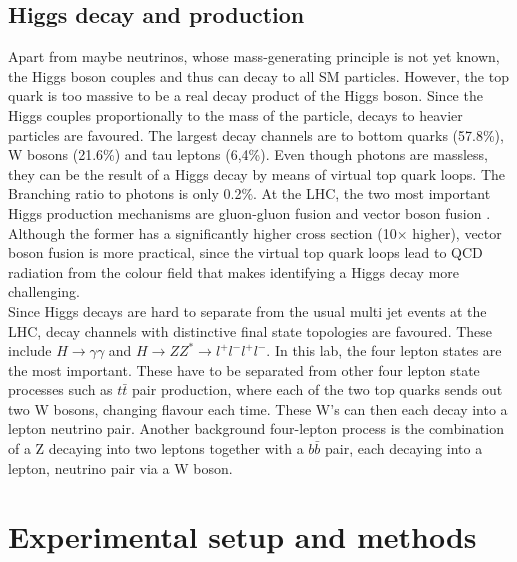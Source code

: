 \documentclass[twoside,        %
               BCOR12mm,       %
               ngerman,english, %
               fleqn,headsepline=false,footsepline=false
              ]{Vorlage/MFPREPORT}
\begin{document}
\subsection{Higgs decay and production}
\label{sec:bg}
Apart from maybe neutrinos, whose mass-generating principle is not yet known,
the Higgs boson couples and thus can decay to all SM particles. However, the
top quark is too massive to be a real decay product of the Higgs boson. Since
the Higgs couples proportionally to the mass of the particle, decays to heavier
particles are favoured. The largest decay channels are to bottom quarks
(57.8\%), W bosons (21.6\%) and tau leptons (6,4\%). Even though photons are
massless, they can be the result of a Higgs decay by means of virtual top quark
loops. The Branching ratio to photons is only 0.2\%.
At the LHC, the two most important Higgs production mechanisms are gluon-gluon
fusion and vector boson fusion \cite[p.\;490f]{thomson}. Although the former
has a significantly higher cross section (10$\times$ higher), vector boson fusion is more
practical, since the virtual top quark loops lead to QCD radiation from the
colour field that makes identifying a Higgs decay more challenging.\\
Since Higgs decays are hard to separate from the usual multi jet events at the
LHC, decay channels with distinctive final state topologies are favoured. These
include $H\rightarrow\gamma\gamma$ and $H\rightarrow ZZ^*\rightarrow
l^+l^-l^+l^-$. In this lab, the four lepton states are the most important. 
These have to be separated from other four lepton state processes such as
$t\bar t$ pair production, where each of the two top quarks sends out two W bosons, changing
flavour each time. These W's can then each decay into a lepton neutrino pair.
Another background four-lepton process is the combination of a Z decaying into
two leptons together with a $b\bar b$ pair, each decaying into a lepton,
neutrino pair via a W boson.




\section{Experimental setup and methods}
\label{sec:setup}
\end{document}
